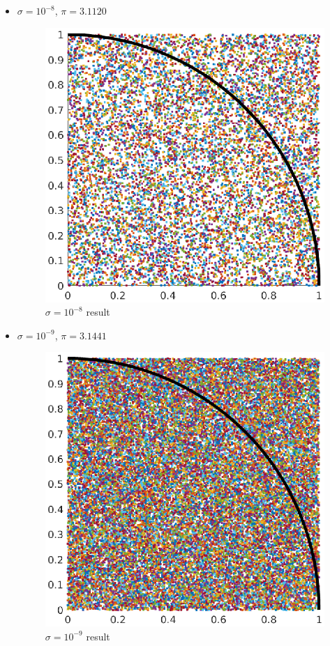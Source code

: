 \begin{itemize}
\begin{figure}[H]
   \end{figure}
    \item $\sigma = 10^{-8}$, $\pi = 3.1120$
    \begin{figure}[H] 
        \caption{$\sigma = 10^{-8}$ result} 
        \centering 
        \includegraphics[width=12cm]{../Figure/Bonus/mont1e-08.eps} 
   \end{figure}
    \item $\sigma = 10^{-9}$, $\pi = 3.1441$
    \begin{figure}[H] 
        \caption{$\sigma = 10^{-9}$ result} 
        \centering 
        \includegraphics[width=12cm]{../Figure/Bonus/mont1e-09.eps} 
   \end{figure}
\end{itemize}

